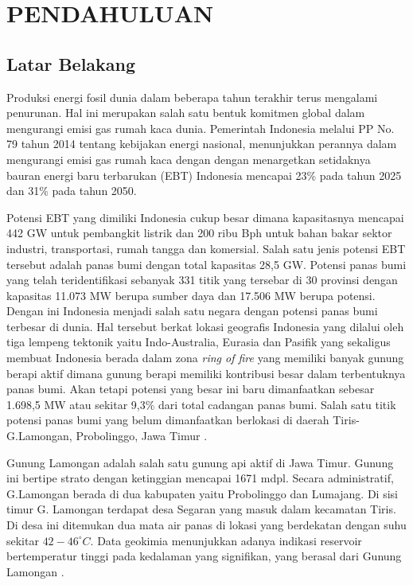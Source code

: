 \chapter{PENDAHULUAN}
\section{Latar Belakang}
\hspace{25pt}Produksi energi fosil dunia dalam beberapa tahun terakhir terus mengalami penurunan. Hal ini merupakan salah satu bentuk komitmen global dalam mengurangi emisi gas rumah kaca dunia\citep{OutlookEnergi2019}. Pemerintah Indonesia melalui PP No. 79 tahun 2014 tentang kebijakan energi nasional, menunjukkan perannya dalam mengurangi emisi gas rumah kaca dengan dengan menargetkan setidaknya bauran energi baru terbarukan (EBT) Indonesia mencapai 23\% pada tahun 2025 dan 31\% pada tahun 2050.

\hspace{25pt}Potensi EBT yang dimiliki Indonesia cukup besar dimana kapasitasnya mencapai 442 GW untuk pembangkit listrik dan 200 ribu Bph untuk bahan bakar sektor industri, transportasi, rumah tangga dan komersial\citep{OutlookEnergi2019}. Salah satu jenis potensi EBT tersebut adalah panas bumi dengan total kapasitas 28,5 GW. Potensi panas bumi yang telah teridentifikasi sebanyak 331 titik yang tersebar di 30 provinsi dengan kapasitas 11.073 MW berupa sumber daya dan 17.506 MW berupa potensi\citep{PanasBumiIndo2017}. Dengan ini Indonesia menjadi salah satu negara dengan potensi panas bumi terbesar di dunia\citep{esdm2018}. Hal tersebut berkat lokasi geografis Indonesia yang dilalui oleh tiga lempeng tektonik yaitu Indo-Australia, Eurasia dan Pasifik yang sekaligus membuat Indonesia berada dalam zona \textit{ring of fire} yang memiliki banyak gunung berapi aktif dimana gunung berapi memiliki kontribusi besar dalam terbentuknya panas bumi. Akan tetapi potensi yang besar ini baru dimanfaatkan sebesar 1.698,5 MW atau sekitar 9,3\% dari total cadangan panas bumi. Salah satu titik potensi panas bumi yang belum dimanfaatkan berlokasi di daerah Tiris-G.Lamongan, Probolinggo, Jawa Timur \citep{PanasBumiIndo2017}.

\hspace{25pt} Gunung Lamongan adalah salah satu gunung api aktif di Jawa Timur. Gunung ini bertipe strato dengan ketinggian mencapai 1671 mdpl. Secara administratif, G.Lamongan berada di dua kabupaten yaitu Probolinggo dan Lumajang. Di sisi timur G. Lamongan terdapat desa Segaran yang masuk dalam kecamatan Tiris. Di desa ini ditemukan dua mata air panas di lokasi yang berdekatan dengan suhu sekitar $42-46^{\circ}C$. Data geokimia menunjukkan adanya indikasi reservoir bertemperatur tinggi pada kedalaman yang signifikan, yang berasal dari Gunung Lamongan \citep{GLamongan}.

